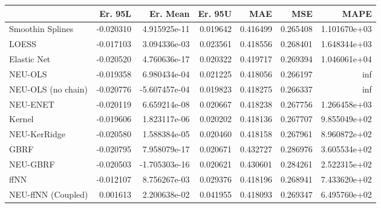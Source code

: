 \begin{tabular}{lrrrrrr}
\toprule
{} &   Er. 95L &      Er. Mean &   Er. 95U &       MAE &       MSE &          MAPE \\
\midrule
Smoothin Splines   & -0.020310 &  4.915925e-11 &  0.019642 &  0.416499 &  0.265408 &  1.101670e+03 \\
LOESS              & -0.017103 &  3.094336e-03 &  0.023561 &  0.418556 &  0.268401 &  1.648344e+03 \\
Elastic Net        & -0.020520 &  4.760636e-17 &  0.020322 &  0.419717 &  0.269394 &  1.046061e+04 \\
NEU-OLS            & -0.019358 &  6.980434e-04 &  0.021225 &  0.418056 &  0.266197 &           inf \\
NEU-OLS (no chain) & -0.020776 & -5.607457e-04 &  0.019823 &  0.418275 &  0.266337 &           inf \\
NEU-ENET           & -0.020119 &  6.659214e-08 &  0.020667 &  0.418238 &  0.267756 &  1.266458e+03 \\
Kernel             & -0.019606 &  1.823117e-06 &  0.020202 &  0.418136 &  0.267707 &  9.855049e+02 \\
NEU-KerRidge       & -0.020580 &  1.588384e-05 &  0.020460 &  0.418158 &  0.267961 &  8.960872e+02 \\
GBRF               & -0.020795 &  7.958079e-17 &  0.020671 &  0.432727 &  0.286976 &  3.605534e+02 \\
NEU-GBRF           & -0.020503 & -1.705303e-16 &  0.020621 &  0.430601 &  0.284261 &  2.522315e+02 \\
ffNN               & -0.012107 &  8.756267e-03 &  0.029376 &  0.418196 &  0.268941 &  7.433620e+02 \\
NEU-ffNN (Coupled) &  0.001613 &  2.200638e-02 &  0.041955 &  0.418093 &  0.269347 &  6.495760e+02 \\
\bottomrule
\end{tabular}
